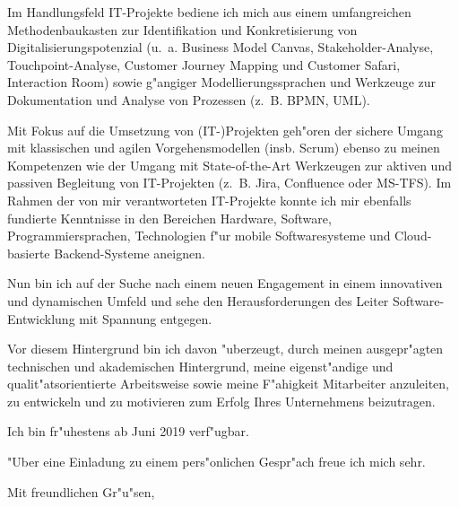 \documentclass[10pt,a4paper]{dinbrief}
\begin{document}
\begin{letter}
Im Handlungsfeld IT-Projekte bediene ich mich aus einem umfangreichen Methodenbaukasten zur Identifikation und Konkretisierung von Digitalisierungspotenzial (u.~a. Business Model Canvas, Stakeholder-Analyse, Touchpoint-Analyse, Customer Journey Mapping und Customer Safari, Interaction Room) sowie g"angiger Modellierungssprachen und Werkzeuge zur Dokumentation und Analyse von Prozessen (z.~B. BPMN, UML).

Mit Fokus auf die Umsetzung von (IT-)Projekten geh"oren der sichere Umgang mit klassischen und agilen Vorgehensmodellen (insb. Scrum) ebenso zu meinen Kompetenzen wie der Umgang mit State-of-the-Art Werkzeugen zur aktiven und passiven Begleitung von IT-Projekten (z.~B. Jira, Confluence oder MS-TFS). Im Rahmen der von mir verantworteten IT-Projekte konnte ich mir ebenfalls fundierte Kenntnisse in den Bereichen Hardware, Software, Programmiersprachen, Technologien f"ur mobile Softwaresysteme und Cloud-basierte Backend-Systeme aneignen.

Nun bin ich auf der Suche nach einem neuen Engagement in einem innovativen und dynamischen Umfeld und sehe den Herausforderungen des Leiter Software-Entwicklung mit Spannung entgegen.

Vor diesem Hintergrund bin ich davon "uberzeugt, durch meinen ausgepr"agten technischen und akademischen Hintergrund, meine eigenst"andige und qualit"atsorientierte Arbeitsweise sowie meine F"ahigkeit Mitarbeiter anzuleiten, zu entwickeln und zu motivieren zum Erfolg Ihres Unternehmens beizutragen.

Ich bin fr"uhestens ab Juni 2019 verf"ugbar. %

"Uber eine Einladung zu einem pers"onlichen Gespr"ach freue ich mich sehr.

\closing{Mit freundlichen Gr"u"sen,}
\end{letter}
\end{document}
